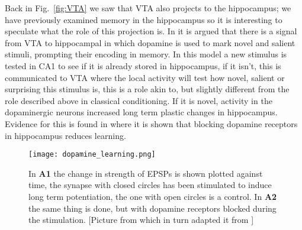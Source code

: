 \documentclass[11pt,a4paper]{scrartcl}
\begin{document}
Back in Fig.~\ref{fig:VTA} we saw that VTA also projects to the
hippocampus; we have previously examined memory in the hippocampus so
it is interesting to speculate what the role of this projection is. In
\cite{LismanGrace2005a} it is argued that there is a signal from VTA
to hippocampal in which dopamine is used to mark novel and salient
stimuli, prompting their encoding in memory. In this model a new
stimulus is tested in CA1 to see if it is already stored in
hippocampus, if it isn't, this is communicated to VTA where the local
activity will test how novel, salient or surprising this stimulus is,
this is a role akin to, but slightly different from the role described
above in classical conditioning. If it is novel, activity in the
dopaminergic neurons increased long term plastic changes in
hippocampus. Evidence for this is found in \cite{MorrisEtAl2003a}
where it is shown that blocking dopamine receptors in hippocampus
reduces learning.

\begin{figure}
\begin{center}
\texttt{[image: dopamine\_learning.png]}
\end{center}
\caption{In \textbf{A1} the change in strength of EPSPs is shown
  plotted against time, the synapse with closed circles has been
  stimulated to induce long term potentiation, the one with open
  circles is a control. In \textbf{A2} the same thing is done, but
  with dopamine receptors blocked during the stimulation. [Picture
    from \cite{LismanGrace2005a} which in turn adapted it from
    \cite{MorrisEtAl2003a}]\label{fig:hippocampus}}
\end{figure}
\end{document}
